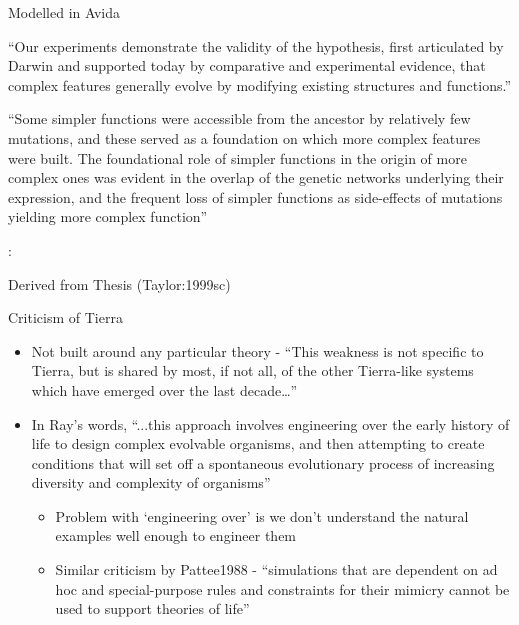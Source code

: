 \autocite{Lenski2003}


	Modelled in Avida

	
	``Our experiments demonstrate the validity of the hypothesis, first
	articulated by Darwin and supported today by comparative and
	experimental evidence, that complex features generally evolve by
	modifying existing structures and functions.''
	

	
	``Some simpler functions were accessible from the ancestor by
	relatively few mutations, and these served as a foundation on which
	more complex features were built. The foundational role of simpler
	functions in the origin of more complex ones was evident in the
	overlap of the genetic networks underlying their expression, and the
	frequent loss of simpler functions as side-effects of mutations
	yielding more complex function''


\autocite{Taylor2001}:


	Derived from Thesis (Taylor:1999sc)
	
	Criticism of Tierra
	\begin{itemize}
		\item
		
		Not built around any particular theory - ``This weakness is not
		specific to Tierra, but is shared by most, if not all, of the other
		Tierra-like systems which have emerged over the last
		decade\ldots{}''
		
		\item
		
		In Ray's words, ``...this approach involves engineering over the
		early history of life to design complex evolvable organisms, and
		then attempting to create conditions that will set off a spontaneous
		evolutionary process of increasing diversity and complexity of
		organisms''
		
		
		\begin{itemize}
			\item
			
			Problem with `engineering over' is we don't understand the natural
			examples well enough to engineer them
			
			\item
			
			Similar criticism by Pattee1988 - ``simulations that are dependent
			on ad hoc and special-purpose rules and constraints for their
			mimicry cannot be used to support theories of life''
			
		\end{itemize}
	\end{itemize}

